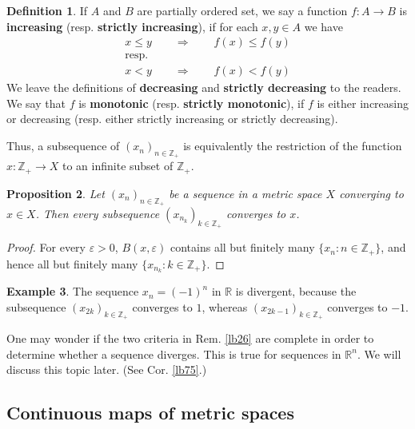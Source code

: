 \documentclass[12pt,b5paper,notitlepage]{article}
\theoremstyle{definition}
\newtheorem{df}{Definition}[section]
\newtheorem{eg}[df]{Example}
\theoremstyle{plain}
\newtheorem{pp}[df]{Proposition}
\newcommand{\Zbb}{\mathbb Z}
\newcommand{\Rbb}{\mathbb R}
\numberwithin{equation}{section}
\begin{document}
\begin{df}
If $A$ and $B$ are partially ordered set, we say a function $f:A\rightarrow B$ is \textbf{increasing}   (resp. \textbf{strictly increasing}), if for each $x,y\in A$ we have
\begin{gather*}
x\leq y\qquad\Longrightarrow\qquad f(x)\leq f(y)\\
\text{resp.}\\
x<y\qquad\Longrightarrow \qquad f(x)<f(y)
\end{gather*}
We leave the definitions of \textbf{decreasing} and \textbf{strictly decreasing} to the readers. We say that $f$ is   \textbf{monotonic} (resp. \textbf{strictly monotonic}), if $f$ is either increasing or decreasing (resp. either strictly increasing or strictly decreasing).
\end{df}

Thus, a subsequence of $(x_n)_{n\in\Zbb_+}$ is equivalently the restriction of the function $x:\Zbb_+\rightarrow X$ to an infinite subset of $\Zbb_+$.

\begin{pp}\label{lb23}
Let $(x_n)_{n\in\Zbb_+}$ be a sequence in a metric space $X$ converging to $x\in X$. Then every subsequence $(x_{n_k})_{k\in\Zbb_+}$ converges to $x$.
\end{pp}

\begin{proof}
For every $\varepsilon>0$, $B(x,\varepsilon)$ contains all but finitely many $\{x_n:n\in\Zbb_+\}$, and hence all but finitely many $\{x_{n_k}:k\in\Zbb_+\}$.
\end{proof}

\begin{eg}\label{lb25}
The sequence $x_n=(-1)^n$ in $\Rbb$ is divergent, because the subsequence $(x_{2k})_{k\in\Zbb_+}$ converges to $1$, whereas $(x_{2k-1})_{k\in\Zbb_+}$ converges to $-1$. 
\end{eg}




One may wonder if the two criteria in Rem. \ref{lb26} are complete in order to determine whether a sequence diverges. This is true for sequences in $\Rbb^n$. We will discuss this topic later. (See Cor. \ref{lb75}.)



\subsection{Continuous maps of metric spaces}
\end{document}
